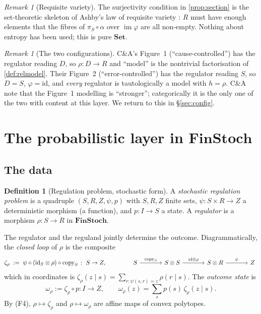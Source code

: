 \documentclass[11pt,a4paper]{article}
\theoremstyle{definition}
\newtheorem{definition}[theorem]{Definition}
\theoremstyle{remark}
\newtheorem{remark}[theorem]{Remark}
\newcommand{\Set}{\mathbf{Set}}
\newcommand{\FinStoch}{\mathbf{FinStoch}}
\newcommand{\copym}[1]{\mathrm{copy}_{#1}}
\newcommand{\id}{\mathrm{id}}
\newcommand{\im}{\operatorname{im}}
\begin{document}
\begin{remark}[Requisite variety]
The surjectivity condition in \ref{prop:section} is the set-theoretic skeleton
of Ashby's law of requisite variety \cite{Ashby1956}: $R$ must have enough
elements that the fibres of $\pi_S\circ\alpha$ over $\im\varphi$ are all
non-empty. Nothing about entropy has been used; this is pure $\Set$.
\end{remark}

\begin{remark}[The two configurations]
C\&A's Figure~1 (``cause-controlled'') has the regulator reading $D$, so
$\rho\colon D\to R$ and ``model'' is the nontrivial factorisation of
\ref{def:relmodel}. Their Figure~2 (``error-controlled'') has the regulator
reading $S$, so $D=S$, $\varphi=\id$, and \emph{every} regulator is
tautologically a model with $h=\rho$. C\&A note that the Figure~1 modelling is
``stronger''; categorically it is the only one of the two with content at this
layer. We return to this in \S\ref{sec:config}.
\end{remark}

\section{The probabilistic layer in $\FinStoch$}

\subsection{The data}

\begin{definition}[Regulation problem, stochastic form]\label{def:stochprob}
A \emph{stochastic regulation problem} is a quadruple $(S,R,Z,\psi,p)$ with $S,R,Z$ finite sets, $\psi\colon S\times R\to Z$ a deterministic morphism (a function), and $p\colon I\to S$ a state. A \emph{regulator} is a morphism $\rho\colon S\to R$ in $\FinStoch$.
\end{definition}

The regulator and the reguland jointly determine the outcome. Diagrammatically,
the \emph{closed loop} of $\rho$ is the composite
\begin{equation}\label{eq:closedloop}
\zeta_\rho\;:=\;\psi\circ(\id_S\otimes\rho)\circ\copym{S}\;\colon\;S\to Z,
\qquad\qquad
\begin{tikzcd}[column sep=large]
S \arrow[r,"\copym{S}"] & S\otimes S \arrow[r,"\id\otimes\rho"] & S\otimes R \arrow[r,"\psi"] & Z
\end{tikzcd}
\end{equation}
which in coordinates is $\zeta_\rho(z\mid s)=\sum_{r:\psi(s,r)=z}\rho(r\mid s)$. The \emph{outcome state} is
\begin{equation}\label{eq:outcome}
\omega_\rho:=\zeta_\rho\circ p\colon I\to Z,\qquad \omega_\rho(z)=\sum_s p(s)\,\zeta_\rho(z\mid s).
\end{equation}
By (F4), $\rho\mapsto\zeta_\rho$ and $\rho\mapsto\omega_\rho$ are affine maps of convex polytopes.
\end{document}
